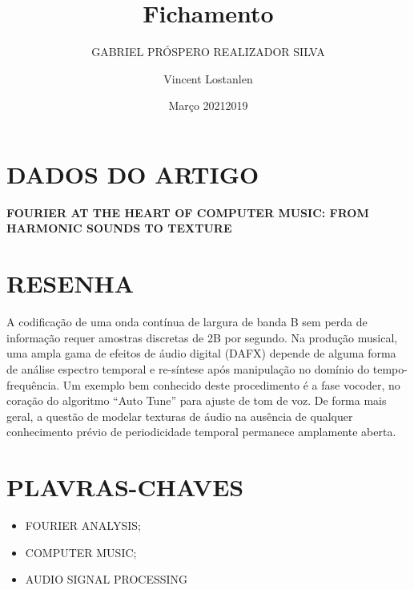 \documentclass{article}
\title{Fichamento}
\author{GABRIEL PRÓSPERO REALIZADOR  SILVA}
\date{Março 2021}
\begin{document}
\maketitle

\section{DADOS DO ARTIGO}
\textbf{FOURIER AT THE HEART OF COMPUTER MUSIC: FROM HARMONIC SOUNDS TO TEXTURE \\}
\author{Vincent Lostanlen \\}
\date{2019}

\section{RESENHA}
A codificação de uma onda contínua de largura de banda B sem perda de informação requer amostras discretas de 2B por segundo. 
Na produção musical, uma ampla gama de efeitos de áudio digital (DAFX) depende de alguma forma de análise espectro temporal e re-síntese após manipulação no domínio do tempo-frequência. 
Um exemplo bem conhecido deste procedimento é a fase vocoder, no coração do algoritmo “Auto Tune” para ajuste de tom de voz. 
De forma mais geral, a questão de modelar texturas de áudio na ausência de qualquer conhecimento prévio de periodicidade temporal permanece amplamente aberta.

\section{PLAVRAS-CHAVES}
\begin{itemize}
    \item FOURIER ANALYSIS; 
    \item COMPUTER MUSIC; 
    \item AUDIO SIGNAL PROCESSING
\end{itemize}
\end{document}
